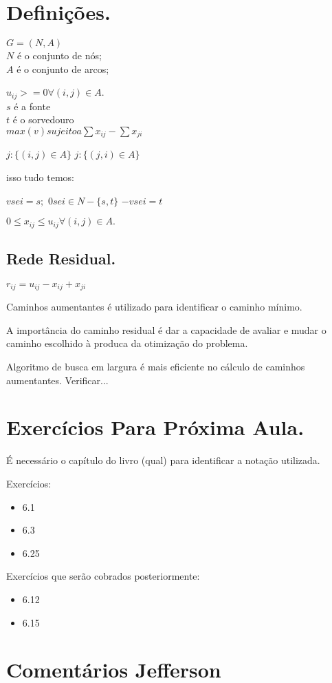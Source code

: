 \documentclass[a4paper,12pt]{article}
\begin{document}

\section{Definições.}

$G = (N, A)$\\
$N$ é o conjunto de nós;\\
$A$ é o conjunto de arcos;

$u_{i j} >= 0 \forall (i, j) \in A$.\\

$s$ é a fonte\\
$t$ é o sorvedouro\\

$max(v) sujeito a \sum{x_{ij}} - \sum{x_{ji}}$

$j: \{(i, j) \in A \}$
$j: \{(j, i) \in A \}$

isso tudo temos:

$v se i = s;$
$0 se i \in N - \{ s, t \}$
$-v se i = t$

$0 \leq x_{ij} \leq u_{ij} \forall (i, j) \in A.$

\subsection{Rede Residual.}

$r_{ij} = u_{ij} - x_{ij} + x_{ji}$

Caminhos aumentantes é utilizado para identificar o caminho mínimo.

A importância do caminho residual é dar a capacidade de avaliar e mudar o caminho escolhido à produca da otimização do problema.

Algoritmo de busca em largura é mais eficiente no cálculo de caminhos aumentantes. Verificar...

\section{Exercícios Para Próxima Aula.}

É necessário o capítulo do livro (qual) para identificar a notação utilizada.

Exercícios:

\begin{itemize}
\item 6.1
\item 6.3
\item 6.25
\end{itemize}

Exercícios que serão cobrados posteriormente:

\begin{itemize}
\item 6.12
\item 6.15
\end{itemize}

\section{Comentários Jefferson}



% 
% 
\end{document}
